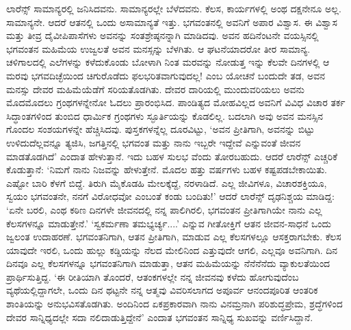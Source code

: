 ಲಾರೆನ್ಸ್ ಸಾಮಾನ್ಯರಲ್ಲಿ ಜನಿಸಿದವನು. ಸಾಮಾನ್ಯರಲ್ಲೇ ಬೆಳೆದವನು. ಕೆಲಸ, ಕಾರ್ಯಗಳಲ್ಲಿ ಅಂಥ ದಕ್ಷನೇನೂ ಅಲ್ಲ. ಸಾಮಾನ್ಯನೇ. ಆದರೆ ಆತನಲ್ಲಿ ಒಂದು ಅಸಾಮಾನ್ಯತೆ ಇತ್ತು. ಭಗವಂತನಲ್ಲಿ ಅವನಿಗೆ ಅಪಾರ ವಿಶ್ವಾಸ. ಈ ವಿಶ್ವಾಸ ಮತ್ತು ತೀವ್ರ ದೈವೀಪಿಪಾಸೆಗಳು ಅವನನ್ನು ಸಂತಶ್ರೇಷ್ಠನನ್ನಾಗಿ ಮಾಡಿದವು. ಅವನ ಹದಿನೆಂಟನೇ ವಯಸ್ಸಿನಲ್ಲಿ ಭಗವಂತನ ಮಹಿಮೆಯ ಉಜ್ವಲತೆ ಅವನ ಮನಸ್ಸನ್ನು ಬೆಳಗಿತು. ಆ ಘಟನೆಯಾದರೋ ತೀರ ಸಾಮಾನ್ಯ. ಚಳಿಗಾಲದಲ್ಲಿ ಎಲೆಗಳನ್ನು ಕಳೆದುಕೊಂಡು ಬೋಳಾಗಿ ನಿಂತ ಮರವನ್ನು ನೋಡುತ್ತ ಇನ್ನು ಕೆಲವೇ ದಿನಗಳಲ್ಲಿ ಆ ಮರವು ಭಗವದಿಚ್ಛೆಯಿಂದ ಚಿಗುರೊಡೆದು ಫಲಭರಿತವಾಗುವುದಲ್ಲ! ಎಂಬ ಯೋಚನೆ ಬಂದುದೇ ತಡ, ಅವನ ಮನಸ್ಸು ದೇವರ ಮಹಿಮೆಯೆಡೆಗೆ ಸರಿಯತೊಡಗಿತು. ದೇವರ ದಾರಿಯಲ್ಲಿ ಮುಂದುವರಿಯಲು ಅವನು ಮೊದಮೊದಲು ಗ್ರಂಥಗಳನ್ನೇನೋ ಓದಲು ಪ್ರಾರಂಭಿಸಿದ. ಪಾಂಡಿತ್ಯದ ಮೋಹವಿಲ್ಲದ ಅವನಿಗೆ ವಿವಿಧ ವಿಚಾರ ತರ್ಕ ಸಿದ್ಧಾಂತಗಳಿಂದ ತುಂಬಿದ ಧಾರ್ಮಿಕ ಗ್ರಂಥಗಳು ಸ್ಫೂರ್ತಿಯನ್ನು ಕೊಡಲಿಲ್ಲ. ಬದಲಾಗಿ ಅವು ಅವನ ಮನಸ್ಸಿನ ಗೊಂದಲ ಸಂಶಯಗಳನ್ನೇ ಹೆಚ್ಚಿಸಿದವು. ಪುಸ್ತಕಗಳನ್ನೆಲ್ಲ ದೂರವಿಟ್ಟು, ‘ಅವನ ಪ್ರೀತಿಗಾಗಿ, ಅವನನ್ನು ಬಿಟ್ಟು ಉಳಿದುದೆಲ್ಲವನ್ನೂ ತ್ಯಜಿಸಿ, ಜಗತ್ತಿನಲ್ಲಿ ಭಗವಂತ ಮತ್ತು ನಾನು ಇಬ್ಬರೇ ಇದ್ದೇವೆ ಎನ್ನುವಂತೆ ಜೀವನ ಮಾಡತೊಡಗಿದೆ’ ಎಂದಾತ ಹೇಳುತ್ತಾನೆ. ಇದು ಬಹಳ ಸುಲಭ ವೆಂದು ತೋರಬಹುದು. ಆದರೆ ಲಾರೆನ್ಸ್ ಎಚ್ಚರಿಕೆ ಕೊಡುತ್ತಾನೆ: ‘ನಿಮಗೆ ನಾನು ನಿಜವನ್ನು ಹೇಳುತ್ತೇನೆ. ಮೊದಲ ಹತ್ತು ವರ್ಷಗಳು ಬಹಳ ಕಷ್ಟಪಡಬೇಕಾಯಿತು. ಎಷ್ಟೋ ಬಾರಿ ಕೆಳಗೆ ಬಿದ್ದೆ. ತಿರುಗಿ ಮೈಕೊಡಹಿ ಮೇಲಕ್ಕೆದ್ದೆ, ನರಳಾಡಿದೆ. ಎಲ್ಲ ಜೀವಿಗಳೂ, ವಿಚಾರಶಕ್ತಿಯೂ, ಸ್ವಯಂ ಭಗವಂತನೇ, ನನಗೆ ವಿರೋಧವೋ ಎಂಬಂತೆ ಕಂಡು ಬಂದಿತು!’ ಆದರೆ ಲಾರೆನ್ಸ್ ದೃಢನಿಶ್ಚಯ ಮಾಡಿದ್ದ: ‘ಏನೇ ಬರಲಿ, ಎಂಥ ಕಠಿಣ ದಿನಗಳೇ ಜೀವನದಲ್ಲಿ ನನ್ನ ಪಾಲಿಗಿರಲಿ, ಭಗವಂತನ ಪ್ರೀತಿಗಾಗಿಯೇ ನಾನು ಎಲ್ಲ ಕೆಲಸಗಳನ್ನೂ ಮಾಡುತ್ತೇನೆ.’ ‘ಸ್ವಕರ್ಮಣಾ ತಮಭ್ಯರ್ಚ್ಯ....’ ಎನ್ನುವ ಗೀತೋಕ್ತಿಗೆ ಆತನ ಜೀವನ-ಸಾಧನೆ ಒಂದು ಜ್ವಲಂತ ಉದಾಹರಣೆ. ಭಗವಂತನಿಗಾಗಿ, ಆತನ ಪ್ರೀತಿಗಾಗಿ, ಮಾಡುವ ಎಲ್ಲ ಕೆಲಸಗಳಲ್ಲೂ ಆಸಕ್ತರಾಗಬೇಕು. ಕೆಲಸ ಯಾವುದೇ ಇರಲಿ, ಒಂದು ಹುಲ್ಲು ಕಡ್ಡಿಯನ್ನು ನೆಲದ ಮೇಲಿನಿಂದ ಎತ್ತುವುದೇ ಆಗಲಿ, ಎಲ್ಲವೂ ಅವನಿಗಾಗಿ. ದಿನ ದಿನವೂ ಎಲ್ಲ ಕೆಲಸಗಳನ್ನೂ ಭಗವಂತನಿಗಾಗಿ ಮಾಡುತ್ತಾ, ಆತನ ಮಹಿಮೆಯನ್ನು ನೆನೆನೆನೆದು ವ್ಯಾಕುಲತೆಯಿಂದ ಪ್ರಾರ್ಥಿಸುತ್ತಿದ್ದ. ‘ಈ ರೀತಿಯಾಗಿ ತೊಂದರೆ, ಆತಂಕಗಳಲ್ಲೇ ನನ್ನ ಜೀವನವು ಕಳೆದು ಹೋಗುವುದೆಂಬ ವ್ಯಥೆಯಲ್ಲಿದ್ದಾಗಲೇ, ಒಂದು ದಿನ ಥಟ್ಟನೇ ನನ್ನ ಆತ್ಮವು ವಿವರಿಸಲಾಗದ ಅಪೂರ್ವ ಆನಂದಪೂರಿತ ಆಂತರಿಕ ಶಾಂತಿಯನ್ನು ಅನುಭವಿಸತೊಡಗಿತು. ಅಂದಿನಿಂದ ಏಕಪ್ರಕಾರವಾಗಿ ನಾನು ವಿನಮ್ರನಾಗಿ ಪರಿಶುದ್ಧಪ್ರೇಮ, ಶ್ರದ್ಧೆಗಳಿಂದ ದೇವರ ಸಾನ್ನಿಧ್ಯದಲ್ಲೇ ಸದಾ ನಲಿದಾಡುತ್ತಿದ್ದೇನೆ’ ಎಂದಾತ ಭಗವಂತನ ಸಾನ್ನಿಧ್ಯ ಸುಖವನ್ನು ವರ್ಣಿಸಿದ್ದಾನೆ.

